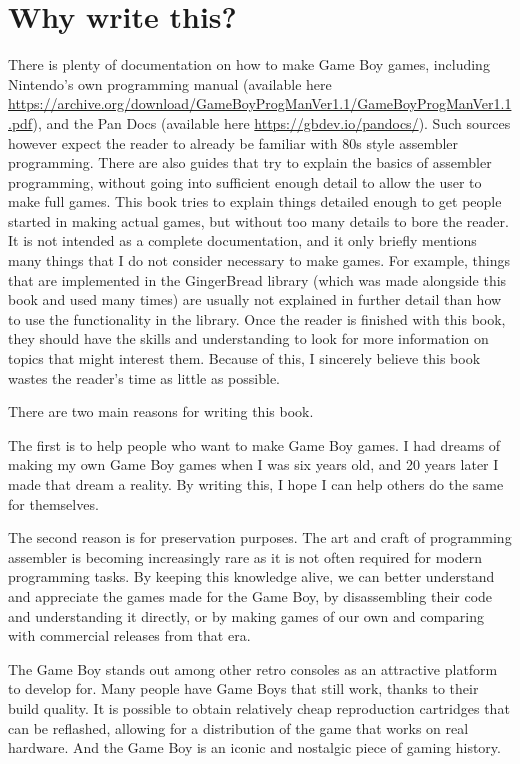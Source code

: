 \documentclass[11pt]{book}
\begin{document}
\section{Why write this?}
There is plenty of documentation on how to make Game Boy games, including Nintendo's own programming manual (available here \url{https://archive.org/download/GameBoyProgManVer1.1/GameBoyProgManVer1.1.pdf}), and the Pan Docs (available here \url{https://gbdev.io/pandocs/}). Such sources however expect the reader to already be familiar with 80s style assembler programming. There are also guides that try to explain the basics of assembler programming, without going into sufficient enough detail to allow the user to make full games. This book tries to explain things detailed enough to get people started in making actual games, but without too many details to bore the reader. It is not intended as a complete documentation, and it only briefly mentions many things that I do not consider necessary to make games. For example, things that are implemented in the GingerBread library (which was made alongside this book and used many times) are usually not explained in further detail than how to use the functionality in the library. Once the reader is finished with this book, they should have the skills and understanding to look for more information on topics that might interest them. Because of this, I sincerely believe this book wastes the reader's time as little as possible.

There are two main reasons for writing this book.

The first is to help people who want to make Game Boy games. I had dreams of making my own Game Boy games when I was six years old, and 20 years later I made that dream a reality. By writing this, I hope I can help others do the same for themselves.

The second reason is for preservation purposes. The art and craft of programming assembler is becoming increasingly rare as it is not often required for modern programming tasks. By keeping this knowledge alive, we can better understand and appreciate the games made for the Game Boy, by disassembling their code and understanding it directly, or by making games of our own and comparing with commercial releases from that era. 

The Game Boy stands out among other retro consoles as an attractive platform to develop for. Many people have Game Boys that still work, thanks to their build quality. It is possible to obtain relatively cheap reproduction cartridges that can be reflashed, allowing for a distribution of the game that works on real hardware. And the Game Boy is an iconic and nostalgic piece of gaming history.
\end{document}
